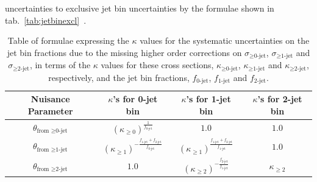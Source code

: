 uncertainties to exclusive jet bin uncertainties by the formulae shown in tab.~\ref{tab:jetbinexcl}~\cite{}.
\begin{table}[!htbp]
\begin{center}
\begin{tabular}{c|ccc}

\hline
Nuisance Parameter & $\kappa$'s for 0-jet bin   & $\kappa$'s for 1-jet bin  & $\kappa$'s for 2-jet bin                       \\
\hline \hline
$\theta_{\textrm{from } \ge \textrm{0-jet}}$  & $ (\kappa_{\geq 0})^{\frac{1}{f_\textrm{0-jet}}}$    & $1.0$ & $1.0$                                            \\
$\theta_{\textrm{from } \ge \textrm{1-jet}}$  & $(\kappa_{\geq 1})^{- \frac{f_\textrm{1-jet}+f_\textrm{2-jet}}{f_\textrm{0-jet}}}$ & $(\kappa_{\geq 1})^{\frac{f_\textrm{1-jet}+f_\textrm{2-jet}}{f_\textrm{1-jet}}}$  & $1.0$                                            \\
$\theta_{\textrm{from } \ge \textrm{2-jet}}$  & $1.0$ & $(\kappa_{\geq 2})^{- \frac{f_\textrm{2-jet}}{f_\textrm{1-jet}}} $     & $\kappa_{\geq 2}$ \\
\hline

\end{tabular}
\caption{Table of formulae expressing the $\kappa$ values for the systematic uncertainties on the
jet bin fractions due to the missing higher order corrections on 
$\sigma_{\ge\textrm{0-jet}}$, $\sigma_{\ge\textrm{1-jet}}$ and $\sigma_{\ge\textrm{2-jet}}$,
in terms of the $\kappa$ values for these cross sections, 
$\kappa_{\ge\textrm{0-jet}}$, $\kappa_{\ge\textrm{1-jet}}$ and $\kappa_{\ge\textrm{2-jet}}$, respectively, 
and the jet bin fractions, 
$f_{\textrm{0-jet}}$, $f_{\textrm{1-jet}}$ and $f_{\textrm{2-jet}}$.
}
\label{tab:jetbinformula}
\end{center}
\end{table}

